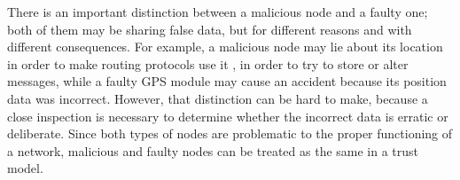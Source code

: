 There is an important distinction between a malicious node and a faulty one; both of them may be sharing false data, but for different reasons and with different consequences.
For example, a malicious node may lie about its location in order to make routing protocols use it \citep{leinmuller2005influence}, in order to try to store or alter messages, while a faulty GPS module may cause an accident because its position data was incorrect.
However, that distinction can be hard to make, because a close inspection is necessary to determine whether the incorrect data is erratic or deliberate.
Since both types of nodes are problematic to the proper functioning of a network, malicious and faulty nodes can be treated as the same in a trust model.


